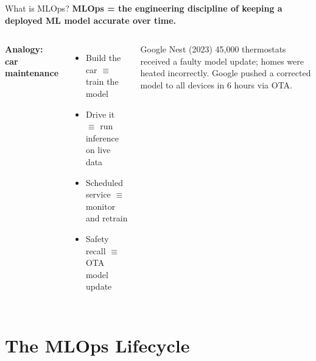 \documentclass[aspectratio=169,11pt]{beamer}
\begin{document}
\begin{frame}{What is MLOps?}
    \small
    \textbf{MLOps = the engineering discipline of keeping a deployed ML model accurate over time.}

    \vspace{0.3cm}
    \begin{columns}
        \textbf{Analogy: car maintenance}
        \begin{itemize}\setlength{\itemsep}{8pt}
            \item Build the car $\equiv$ train the model
            \item Drive it $\equiv$ run inference on live data
            \item Scheduled service $\equiv$ monitor and retrain
            \item Safety recall $\equiv$ OTA model update
        \end{itemize}

        \begin{exampleblock}{Google Nest (2023)}
            45,000 thermostats received a faulty model update; homes were heated incorrectly. Google pushed a corrected model to all devices in 6 hours via OTA.
        \end{exampleblock}
    \end{columns}
\end{frame}

\section{The MLOps Lifecycle}
\end{document}
